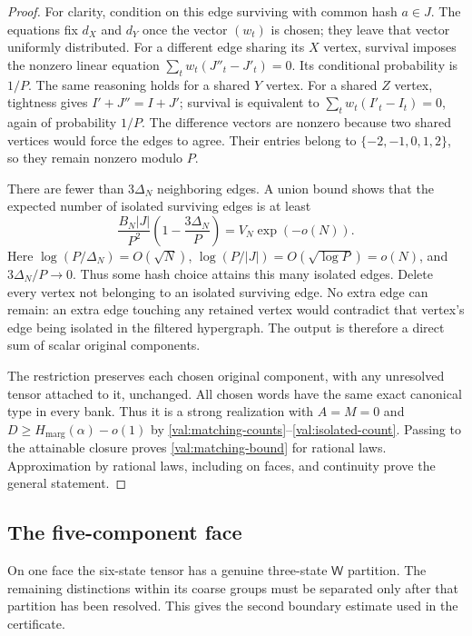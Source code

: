 \begin{proof}
For clarity, condition on this edge surviving with common hash $a\in J$.
The equations fix $d_X$ and $d_Y$ once the vector $(w_t)$ is chosen; they
leave that vector uniformly distributed.  For a different edge sharing its
$X$ vertex, survival imposes the nonzero linear equation
$\sum_t w_t(J''_t-J'_t)=0$.  Its conditional probability is $1/P$.
The same reasoning holds for a shared $Y$ vertex.  For a shared $Z$ vertex,
tightness gives $I'+J''=I+J'$; survival is equivalent to
$\sum_t w_t(I'_t-I_t)=0$, again of probability $1/P$.
The difference vectors are nonzero because two shared vertices would force
the edges to agree.  Their entries belong to $\{-2,-1,0,1,2\}$, so they
remain nonzero modulo $P$.

There are fewer than $3\Delta_N$ neighboring edges.  A union bound shows
that the expected number of isolated surviving edges is at least
\begin{equation}
 \frac{B_N|J|}{P^2}
       \left(1-\frac{3\Delta_N}{P}\right)
       =V_N\exp(-o(N)).
\label{val:isolated-count}
\end{equation}
Here $\log(P/\Delta_N)=O(\sqrt N)$,
$\log(P/|J|)=O(\sqrt{\log P})=o(N)$, and
$3\Delta_N/P\to0$.  Thus some hash choice attains this many isolated edges.
Delete every vertex not belonging to an isolated surviving edge.  No extra
edge can remain: an extra edge touching any retained vertex would contradict
that vertex's edge being isolated in the filtered hypergraph.  The output
is therefore a direct sum of scalar original components.

The restriction preserves each chosen original component, with any
unresolved tensor attached to it, unchanged.  All chosen words have the
same exact canonical type in every bank.  Thus it is a strong realization
with $A=M=0$ and
$D\ge H_{\mathrm{marg}}(\alpha)-o(1)$ by
\eqref{val:matching-counts}--\eqref{val:isolated-count}.
Passing to the attainable closure proves \eqref{val:matching-bound} for
rational laws.  Approximation by rational laws, including on faces, and
continuity prove the general statement.
\end{proof}

\subsection{The five-component face}
\label{val:face-section}

On one face the six-state tensor has a genuine three-state $\mathsf W$ partition.
The remaining distinctions within its coarse groups must be separated only
after that partition has been resolved.  This gives the second boundary
estimate used in the certificate.

